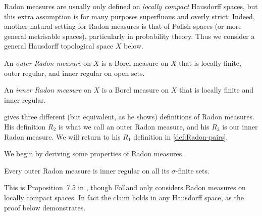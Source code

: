 \documentclass[article, a4paper, 11pt, oneside]{memoir}
\numberwithin{equation}{chapter}
\begin{document}
Radon measures are usually only defined on \emph{locally compact} Hausdorff spaces, but this extra assumption is for many purposes superfluous and overly strict: Indeed, another natural setting for Radon measures is that of Polish spaces (or more general metrisable spaces), particularly in probability theory. Thus we consider a general Hausdorff topological space $X$ below.

\newcommand{\calM}{\mathcal{M}}
\newcommand{\radonout}{\calM^{+}}
\newcommand{\radonin}{\calM^{-}}

\begin{definition}
    \label{def:Radon-measures}
    An \emph{outer Radon measure} on $X$ is a Borel measure on $X$ that is locally finite, outer regular, and inner regular on open sets.

    An \emph{inner Radon measure} on $X$ is a Borel measure on $X$ that is locally finite and inner regular.
\end{definition}
%
\textcite{schwartz1973} gives three different (but equivalent, as he shows) definitions of Radon measures. His definition $R_2$ is what we call an outer Radon measure, and his $R_3$ is our inner Radon measure. We will return to his $R_1$ definition in \cref{def:Radon-pairs}.

We begin by deriving some properties of Radon measures.


\begin{proposition}
    \label{thm:outer-Radon-inner-regular-on-finites}
    Every outer Radon measure is inner regular on all its $\sigma$-finite sets.
\end{proposition}
%
This is Proposition~7.5 in \textcite{folland2007}, though Folland only considers Radon measures on locally compact spaces. In fact the claim holds in any Hausdorff space, as the proof below demonstrates.
\end{document}
